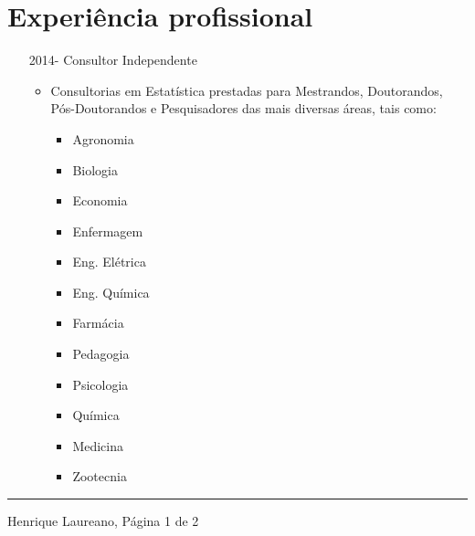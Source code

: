 \message{ !name(vitae.tex)}\documentclass[12pt]{article}
\newcommand{\horrule}[1]{\noindent\rule{\linewidth}{#1}}
\begin{document}
\section*{Experi\^{e}ncia profissional}

\begin{itemize}
 \item[2014-] Consultor Independente
  \begin{itemize}
   \item Consultorias em Estat\'{i}stica prestadas para Mestrandos,
         Doutorandos, P\'{o}s-Doutorandos e Pesquisadores das mais
         diversas \'{a}reas, tais como:
    \begin{multicols}{4}
      \begin{itemize}
      \item Agronomia
      \item Biologia
      \item Economia
      \item Enfermagem
      \item Eng. El\'{e}trica
      \item Eng. Qu\'{i}mica
      \item Farm\'{a}cia
      \item Pedagogia
      \item Psicologia
      \item Qu\'{i}mica
      \item Medicina
      \item Zootecnia
     \end{itemize}
    \end{multicols}
  \end{itemize}
\end{itemize}

\vspace{\fill}
\horrule{1pt}
\noindent Henrique Laureano, \hfill P\'{a}gina 1 de 2
\end{document}
